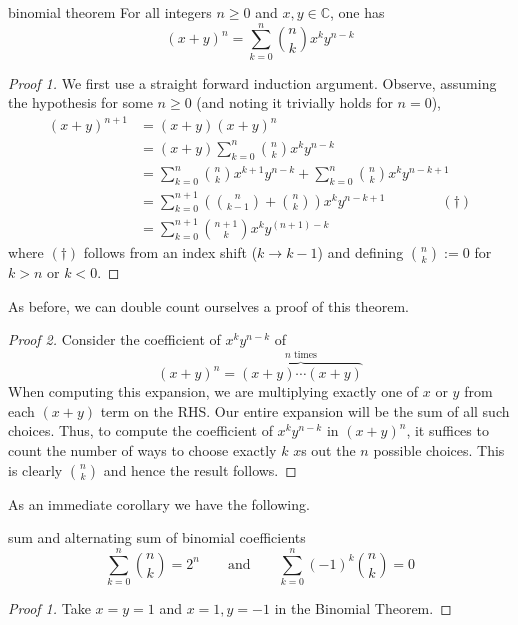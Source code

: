 \documentclass{article}
\begin{document}
\begin{theorem}[]{binomial theorem}
    For all integers $n \geq 0$ and $x, y \in \mathbb{C}$, one has
    \[(x + y)^n = \sum_{k=0}^n \binom{n}{k}x^ky^{n-k}\]
\end{theorem}

\begin{proof}[Proof 1]
    We first use a straight forward induction argument. Observe, assuming the hypothesis for some $n \geq 0$ (and noting it trivially holds for $n=0$),
    \begin{align*}
        (x+y)^{n+1} &= (x+y)(x+y)^n \\
        &= (x+y)\sum_{k=0}^n \binom{n}{k}x^k y^{n-k} \\
        &= \sum_{k=0}^n \binom{n}{k}x^{k+1}y^{n-k} + \sum_{k=0}^n \binom{n}{k}x^k y^{n-k+1} \\
        &= \sum_{k=0}^{n+1} \left(\binom{n}{k-1} + \binom{n}{k}\right)x^ky^{n - k + 1} \qquad \qquad (\dagger)\\
        &= \sum_{k=0}^{n+1}\binom{n+1}{k}x^ky^{(n+1)-k}
    \end{align*}
    where $(\dagger)$ follows from an index shift ($k \to k-1$) and defining $\binom{n}{k} := 0$ for $k > n$ or $k < 0$.
\end{proof}

As before, we can double count ourselves a proof of this theorem. 

\begin{proof}[Proof 2]
    Consider the coefficient of $x^ky^{n-k}$ of \[(x+y)^n = \overbrace{(x+y)\cdots(x+y)}^{n \text{ times}}\] When computing this expansion, 
    we are multiplying exactly one of $x$ or $y$ from each $(x+y)$ term on the RHS. Our entire expansion will be the sum of all such choices. 
    Thus, to compute the coefficient of $x^ky^{n-k}$ in $(x+y)^n$, it suffices to count the number of ways to choose exactly $k$ $x$s out the 
    $n$ possible choices. This is clearly $\binom{n}{k}$ and hence the result follows. 
\end{proof}

As an immediate corollary we have the following.

\begin{corollary}[]{sum and alternating sum of binomial coefficients}
    \[\sum_{k=0}^n \binom{n}{k} = 2^n \qquad \text{and} \qquad \sum_{k=0}^n (-1)^k \binom{n}{k} = 0\]
\end{corollary}

\begin{proof}[Proof 1]
    Take $x=y=1$ and $x=1, y=-1$ in the Binomial Theorem. 
\end{proof}
\end{document}
